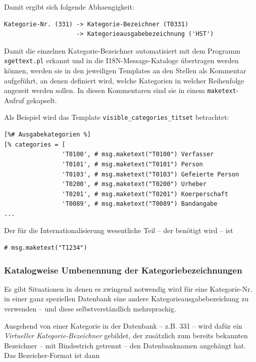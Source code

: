 \documentclass[11pt, twoside, a4paper, BCOR8mm, DIV12, bibtotoc,idxtotoc]{scrbook}
\begin{document}
Damit ergibt sich folgende Abhaengigkeit:

\begin{verbatim}
Kategorie-Nr. (331) -> Kategorie-Bezeichner (T0331) 
                    -> Kategorieausgabebezeichnung ('HST')
\end{verbatim}

Damit die einzelnen Kategorie-Bezeichner automatisiert mit dem
Programm \texttt{xgettext.pl} erkannt und in die I18N-Message-Kataloge
übertragen werden können, werden sie in den jeweiligen Templates an
den Stellen als Kommentar aufgeführt, an denen definiert wird, welche
Kategorien in welcher Reihenfolge angezeit werden sollen. In diesen
Kommentaren sind sie in einem \texttt{maketext}-Aufruf gekapselt.

Als Beispiel wird das Template \texttt{visible\_categories\_titset}
betrachtet:

\begin{verbatim}
[%# Ausgabekategorien %]
[% categories = [
                'T0100', # msg.maketext("T0100") Verfasser
                'T0101', # msg.maketext("T0101") Person
                'T0103', # msg.maketext("T0103") Gefeierte Person
                'T0200', # msg.maketext("T0200") Urheber
                'T0201', # msg.maketext("T0201") Koerperschaft
                'T0089', # msg.maketext("T0089") Bandangabe  
...
\end{verbatim}

Der für die Internationalisierung wesentliche Teil -- der benötigt
wird -- ist

\begin{verbatim}
# msg.maketext("T1234")
\end{verbatim}

\subsubsection{Katalogweise Umbenennung der Kategoriebezeichnungen}

Es gibt Situationen in denen es zwingend notwendig wird für eine
Kategorie-Nr. in einer ganz speziellen Datenbank eine andere
Kategorieausgabe\-bezeichung zu verwenden -- und diese
selbst\-verständlich mehrsprachig.

Ausgehend von einer Kategorie in der Datenbank -- z.B. 331 -- wird
dafür ein \emph{Virtueller Kategorie-Bezeichner} gebildet, der
zusätzlich zum bereits bekannten Bezeichner -- mit Bindestrich
getrennt -- den Datenbanknamen angehängt hat. Das Bezeicher-Format ist
dann
\end{document}
